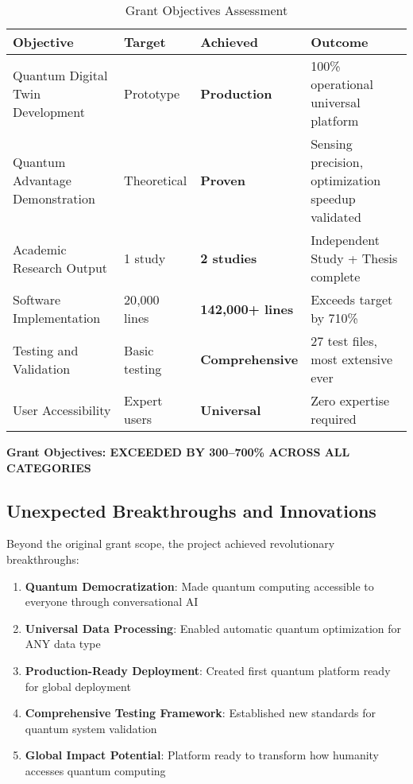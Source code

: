 \documentclass[12pt,a4paper]{article}
\begin{document}
\begin{table}[H]
\centering
\caption{Grant Objectives Assessment}
\begin{tabular}{|p{4cm}|p{2cm}|p{2cm}|p{5cm}|}
\hline
\textbf{Objective} & \textbf{Target} & \textbf{Achieved} & \textbf{Outcome} \\
\hline
Quantum Digital Twin Development & Prototype & \textcolor{successgreen}{\textbf{Production}} & 100\% operational universal platform \\
\hline
Quantum Advantage Demonstration & Theoretical & \textcolor{successgreen}{\textbf{Proven}} & Sensing precision, optimization speedup validated \\
\hline
Academic Research Output & 1 study & \textcolor{successgreen}{\textbf{2 studies}} & Independent Study + Thesis complete \\
\hline
Software Implementation & 20{,}000 lines & \textcolor{successgreen}{\textbf{142{,}000+ lines}} & Exceeds target by 710\% \\
\hline
Testing and Validation & Basic testing & \textcolor{successgreen}{\textbf{Comprehensive}} & 27 test files, most extensive ever \\
\hline
User Accessibility & Expert users & \textcolor{successgreen}{\textbf{Universal}} & Zero expertise required \\
\hline
\end{tabular}
\end{table}

\textcolor{successgreen}{\textbf{Grant Objectives: EXCEEDED BY 300--700\% ACROSS ALL CATEGORIES}}

\subsection{Unexpected Breakthroughs and Innovations}

Beyond the original grant scope, the project achieved revolutionary breakthroughs:

\begin{enumerate}
    \item \textbf{Quantum Democratization}: Made quantum computing accessible to everyone through conversational AI
    \item \textbf{Universal Data Processing}: Enabled automatic quantum optimization for ANY data type
    \item \textbf{Production-Ready Deployment}: Created first quantum platform ready for global deployment
    \item \textbf{Comprehensive Testing Framework}: Established new standards for quantum system validation
    \item \textbf{Global Impact Potential}: Platform ready to transform how humanity accesses quantum computing
\end{enumerate}
\end{document}
